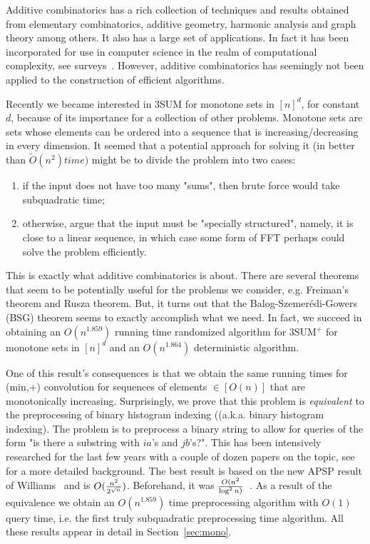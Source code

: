 \documentclass[11pt]{article}
\begin{document}
{Additive combinatorics has a rich collection of techniques and results obtained from elementary combinatorics, additive geometry, harmonic analysis and graph theory among others. It also has a large set of applications. In fact it has been incorporated for use in computer science in the realm of computational complexity, see surveys~\cite{Lovett14,Viola11}. However, additive combinatorics has seemingly not been applied to the construction of efficient algorithms.

Recently we became interested in 3SUM for monotone sets in $[n]^d$, for constant $d$, because of its importance for a collection of other problems. Monotone sets are sets whose elements can be ordered into a sequence that is increasing/decreasing in every dimension. It seemed that a potential approach for solving it (in better than $\tilde{O}(n^2) time)$ might be to divide the problem into two cases:

\begin{enumerate}
\item
if the input does not have too many "sums", then
   brute force would take subquadratic time;
\item
otherwise, argue that the input must be "specially structured",
   namely, it is close to a linear sequence, in which case some form of FFT perhaps could
   solve the problem efficiently.
\end{enumerate}

This is exactly what additive combinatorics is about. There are several theorems that seem to be potentially useful for the problems we consider, e.g. Freiman's theorem and Rusza theorem. But, it turns out that the Balog-Szemer\'{e}di-Gowers (BSG) theorem seems to exactly accomplish what we need. In fact, we succeed in obtaining an $O(n^{1.859})$ running time randomized algorithm for 3SUM$^+$ for monotone sets in $[n]^d$ and an $O(n^{1.864})$ deterministic algorithm.



One of this result's consequences is that we obtain the same running times for (min,+) convolution for sequences of elements $\in [O(n)]$ that are monotonically increasing. Surprisingly, we prove that this problem is {\em equivalent} to the preprocessing of binary histogram indexing ((a.k.a. binary histogram indexing). The problem is to preprocess a binary string to allow for queries of the form "is there a substring with $i a$'s and $j b$'s?". This has been intensively researched for the last few years with a couple of dozen papers on the topic, see~\cite{ACLL14} for a more detailed background. The best result is based on the new APSP result of Williams~\cite{Williams14} and is $O({n^2\over 2^{\sqrt{n}}})$. Beforehand, it was $O(n^2 \over \log^2n)$~\cite{}. As a result of the equivalence we obtain an $O(n^{1.859})$ time preprocessing algorithm with $O(1)$ query time, i.e. the first truly subquadratic preprocessing time algorithm. All these results appear in detail in Section~\ref{sec:mono}.


}
\end{document}
